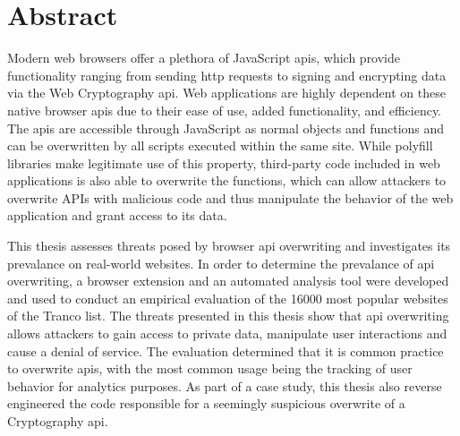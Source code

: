 {\let\clearpage\relax
\chapter*{Abstract}
}

Modern web browsers offer a plethora of JavaScript \acsp{api}, which provide functionality ranging from sending \acs{http} requests to signing and encrypting data via the Web Cryptography \acs{api}. Web applications are highly dependent on these native browser \acsp{api} due to their ease of use, added functionality, and efficiency. The \acsp{api} are accessible through JavaScript as normal objects and functions and can be overwritten by all scripts executed within the same site. While polyfill libraries make legitimate use of this property, third-party code included in web applications is also able to overwrite the functions, which can allow attackers to overwrite APIs with malicious code and thus manipulate the behavior of the web application and grant access to its data.

This thesis assesses threats posed by browser \acs{api} overwriting and investigates its prevalance on real-world websites. In order to determine the prevalance of \acs{api} overwriting, a browser extension and an automated analysis tool were developed and used to conduct an empirical evaluation of the \num[round-precision=0]{16000} most popular websites of the Tranco list. The threats presented in this thesis show that \acs{api} overwriting allows attackers to gain access to private data, manipulate user interactions and cause a denial of service. The evaluation determined that it is common practice to overwrite \acsp{api}, with the most common usage being the tracking of user behavior for analytics purposes. As part of a case study, this thesis also reverse engineered the code responsible for a seemingly suspicious overwrite of a Cryptography \acs{api}.
